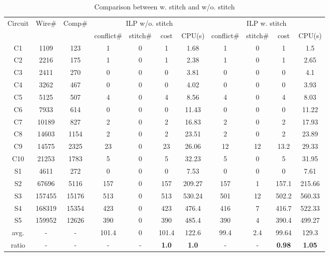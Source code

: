 \documentclass[12pt]{spieman}
\theoremstyle{plain}
\begin{document}
\begin{spacing}{1}
\iffalse
\begin{table*}[htb]
\centering
\renewcommand{\arraystretch}{0.9}
\caption{Comparison between w. stitch and w/o. stitch}
\label{tab:tplec_stitch}
\resizebox{16.4cm}{!} {
\begin{tabular}{|c|c|c |c|c|c|c||c|c|c|c||}
  \hline \hline
  \multirow{2}{*}{Circuit} &\multirow{2}{*}{Wire\#}  &\multirow{2}{*}{Comp\#} &\multicolumn{4}{c||}{ILP w/o. stitch} & \multicolumn{4}{c|}{ILP w. stitch}\\
  \cline{4-11} &        &         &conflict\# &stitch\#  & cost & CPU(s)        &conflict\#    &stitch\#      &cost  & CPU(s) \\
  \hline
 C1           &1109    &123        &1     &0   &1     &1.68        &1     &0   &1      &1.5    \\
 C2           &2216    &175        &1     &0   &1     &2.38        &1     &0   &1      &2.65   \\ 
 C3           &2411    &270        &0     &0   &0     &3.81        &0     &0   &0      &4.1    \\
 C4           &3262    &467        &0     &0   &0     &4.02        &0     &0   &0      &3.93   \\ 
 C5           &5125    &507        &4     &0   &4     &8.56        &4     &0   &4      &8.03   \\ 
 C6           &7933    &614        &0     &0   &0     &11.43       &0     &0   &0      &11.22  \\ 
 C7           &10189   &827        &2     &0   &2     &16.83       &2     &0   &2      &17.93  \\ 
 C8           &14603   &1154       &2     &0   &2     &23.51       &2     &0   &2      &23.89  \\ 
 C9           &14575   &2325       &23    &0   &23    &26.06       &12    &12  &13.2   &29.33  \\ 
 C10          &21253   &1783       &5     &0   &5     &32.23       &5     &0   &5      &31.95  \\ 
 S1           &4611    &272        &0     &0   &0     &7.53        &0     &0   &0      &7.61   \\ 
 S2           &67696   &5116       &157   &0   &157   &209.27      &157   &1   &157.1  &215.66 \\ 
 S3           &157455  &15176      &513   &0   &513   &530.24      &501   &12  &502.2  &560.33 \\ 
 S4           &168319  &15354      &423   &0   &423   &476.4       &416   &7   &416.7  &522.33 \\ 
 S5           &159952  &12626      &390   &0   &390   &485.4       &390   &4   &390.4  &499.27 \\ 
 \hline
 avg.         &-       &-          &101.4 &0   &101.4 &122.6       &99.4  &2.4 &99.64  &129.3  \\
 \hline
 ratio        &-       &-          &-	    &-    &\textbf{1.0}   &\textbf{1.0}
                                   &-     &-    &\textbf{0.98}  &\textbf{1.05}\\


\end{tabular}}
\end{table*}
\end{spacing}
\end{document}

